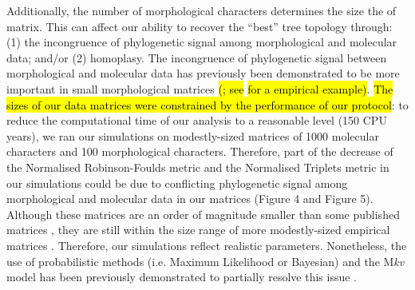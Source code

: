 \documentclass[12pt,letterpaper]{article}
\begin{document}
Additionally, the number of morphological characters determines the size the of matrix.
This can affect our ability to recover the ``best'' tree topology through: (1) the incongruence of phylogenetic signal among morphological and molecular data; and/or (2) homoplasy.
The incongruence of phylogenetic signal between morphological and molecular data has previously been demonstrated to be more important in small morphological matrices \hl{(}\citealt{bremer1992phylogeny,patterson1993congruence}\hl{; see }\citealt{masters2002lack}\hl{ for a empirical example)}.
\hl{The sizes of our data matrices were constrained by the performance of our protocol}: to reduce the computational time of our analysis to a reasonable level (150 CPU years), we ran our simulations on modestly-sized matrices of 1000 molecular characters and 100 morphological characters.
Therefore, part of the decrease of the Normalised Robinson-Foulds metric and the Normalised Triplets metric in our simulations could be due to conflicting phylogenetic signal among morphological and molecular data in our matrices (Figure 4 and Figure 5).
Although these matrices are an order of magnitude smaller than some published matrices \citep[e.g.][]{springermacroevolutionary2012,nithe2013}, they are still within the size range of more modestly-sized empirical matrices \citep[e.g.][]{kellymolecular2014, sallam2011craniodental}.
Therefore, our simulations reflect realistic parameters.
Nonetheless, the use of probabilistic methods (i.e. Maximum Likelihood or Bayesian) and the M\textit{kv} model \citep{lewisa2001} has been previously demonstrated to partially resolve this issue \citep{wrightbayesian2014}.
\end{document}
